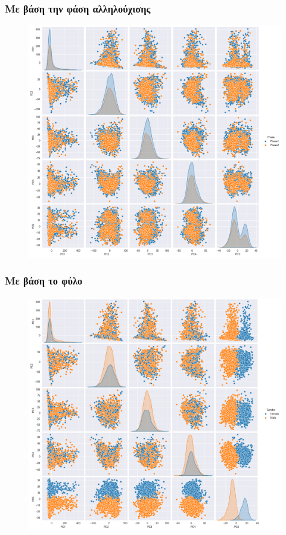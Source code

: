 \documentclass[12pt]{report}
\begin{document}
            \subsubsection*{Με βάση την φάση αλληλούχισης}
                \begin{figure}[H]
                    \centering
                    \includegraphics[width=1\textwidth]{Chapter-2-Section-2.1/ppmi-pca-pd-ctrl-all-visits-hue-phase.png}
                    \label{fig:app_pca_phase}
                \end{figure}
            \subsubsection*{Με βάση το φύλο}
                \begin{figure}[H]
                    \centering
                    \includegraphics[width=1\textwidth]{Chapter-2-Section-2.1/ppmi-pca-pd-ctrl-all-visits-hue_gender.png}
                    \label{fig:app_pca_gender}
                \end{figure}
\end{document}
